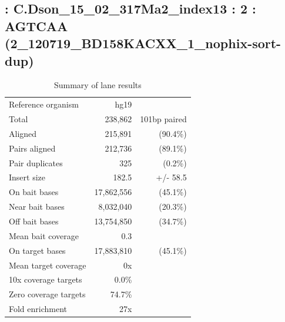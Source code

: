 \documentclass{article}
\begin{document}
    
\subsection*{ : C.Dson\_15\_02\_317Ma2\_index13 : 2 : AGTCAA (2\_120719\_BD158KACXX\_1\_nophix-sort-dup)}

    \begin{table}[h]
    \centering
    \begin{tabular}{|l|rr|}
    \hline
            Reference organism & hg19 &  \\ 
            Total & 238,862 & 101bp paired \\ 
            Aligned & 215,891 & (90.4\%) \\ 
            Pairs aligned & 212,736 & (89.1\%) \\ 
            Pair duplicates & 325 & (0.2\%) \\ 
            Insert size & 182.5 & +/- 58.5 \\ 
            \hline
            On bait bases & 17,862,556 & (45.1\%) \\ 
            Near bait bases & 8,032,040 & (20.3\%) \\ 
            Off bait bases & 13,754,850 & (34.7\%) \\ 
            Mean bait coverage & 0.3 &  \\ 
            On target bases & 17,883,810 & (45.1\%) \\ 
            Mean target coverage & 0x &  \\ 
            10x coverage targets & 0.0\% &  \\ 
            Zero coverage targets & 74.7\% &  \\ 
            Fold enrichment & 27x &  \\ 
    \hline
    \end{tabular}
    \caption{Summary of lane results}
    \end{table}
\end{document}
